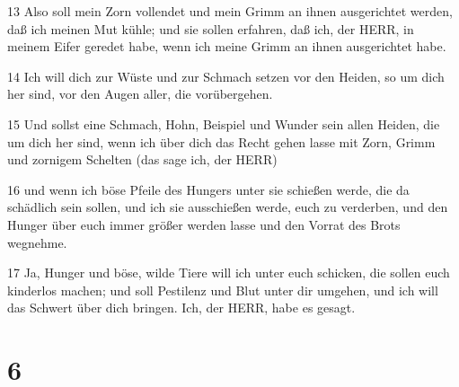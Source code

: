 \par 13 Also soll mein Zorn vollendet und mein Grimm an ihnen ausgerichtet werden, daß ich meinen Mut kühle; und sie sollen erfahren, daß ich, der HERR, in meinem Eifer geredet habe, wenn ich meine Grimm an ihnen ausgerichtet habe.
\par 14 Ich will dich zur Wüste und zur Schmach setzen vor den Heiden, so um dich her sind, vor den Augen aller, die vorübergehen.
\par 15 Und sollst eine Schmach, Hohn, Beispiel und Wunder sein allen Heiden, die um dich her sind, wenn ich über dich das Recht gehen lasse mit Zorn, Grimm und zornigem Schelten (das sage ich, der HERR)
\par 16 und wenn ich böse Pfeile des Hungers unter sie schießen werde, die da schädlich sein sollen, und ich sie ausschießen werde, euch zu verderben, und den Hunger über euch immer größer werden lasse und den Vorrat des Brots wegnehme.
\par 17 Ja, Hunger und böse, wilde Tiere will ich unter euch schicken, die sollen euch kinderlos machen; und soll Pestilenz und Blut unter dir umgehen, und ich will das Schwert über dich bringen. Ich, der HERR, habe es gesagt.

\chapter{6}

